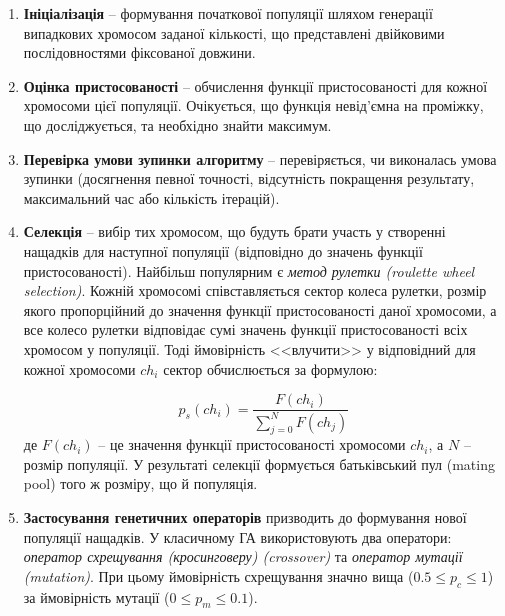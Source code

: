 \begin{enumerate}
    \item \textbf{Ініціалізація} -- формування початкової популяції шляхом генерації випадкових хромосом
    заданої кількості, що представлені двійковими послідовностями фіксованої довжини.
    \item \textbf{Оцінка пристосованості} -- обчислення функції пристосованості для кожної хромосоми цієї популяції.
    Очікується, що функція невід'ємна на проміжку, що досліджується, та необхідно знайти максимум.
    \item \textbf{Перевірка умови зупинки алгоритму} -- перевіряється, чи виконалась умова зупинки (досягнення певної точності,
    відсутність покращення результату, максимальний час або кількість ітерацій).
    \item \textbf{Селекція} -- вибір тих хромосом, що будуть брати участь у створенні нащадків для наступної популяції
    (відповідно до значень функції пристосованості).
    Найбільш популярним є \emph{метод рулетки (roulette wheel selection)}.
    Кожній хромосомі співставляється сектор колеса рулетки, розмір якого пропорційний до значення функції пристосованості
    даної хромосоми, а все колесо рулетки відповідає сумі значень функції пристосованості всіх хромосом у популяції.
    Тоді ймовірність <<влучити>> у відповідний для кожної хромосоми $ch_i$ сектор обчислюється за формулою:

    \[p_s(ch_i) = \frac{F(ch_i)}{\displaystyle\sum_{j=0}^{N} F(ch_j)}\]
    де $F(ch_i)$ -- це значення функції пристосованості хромосоми $ch_i$, а $N$ -- розмір популяції.
    У результаті селекції формується батьківський пул (mating pool) того ж розміру, що й популяція.
    \item \textbf{Застосування генетичних операторів} призводить до формування нової популяції нащадків.
    У класичному ГА використовують два оператори: \emph{оператор схрещування (кросинговеру) (crossover)} та
    \emph{оператор мутації (mutation)}.
    При цьому ймовірність схрещування значно вища ($0.5 \leq p_c \leq 1$) за ймовірність мутації ($0 \leq p_m \leq 0.1$).


\end{enumerate}
